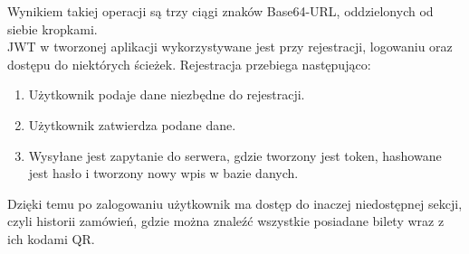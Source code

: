 \documentclass[12pt]{article}
\begin{document}
\begin{sloppypar}
{{\begin{figure}[H]
      \label{fig:jwt_signature}
    \end{figure}
    Wynikiem takiej operacji są trzy ciągi znaków Base64-URL, oddzielonych od siebie kropkami.\\
    JWT w tworzonej aplikacji wykorzystywane jest przy rejestracji, logowaniu oraz dostępu do niektórych ścieżek. 
    Rejestracja przebiega następująco:
    \begin{enumerate}
      \item Użytkownik podaje dane niezbędne do rejestracji.
      \item Użytkownik zatwierdza podane dane.
      \item Wysyłane jest zapytanie do serwera, gdzie tworzony jest token, hashowane jest hasło i tworzony nowy wpis w bazie danych.
    \end{enumerate}
    Dzięki temu po zalogowaniu użytkownik ma dostęp do inaczej niedostępnej sekcji, czyli historii zamówień, gdzie można znaleźć wszystkie posiadane bilety wraz z ich kodami QR.
  }
}


\end{sloppypar}
\end{document}
